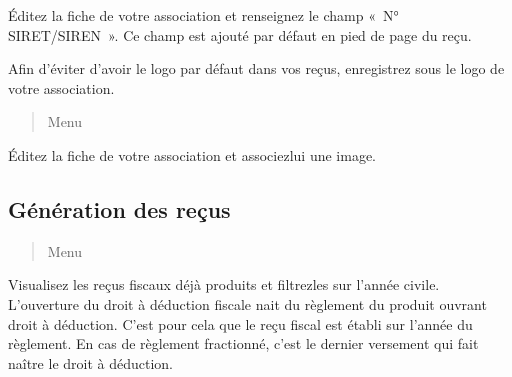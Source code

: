 \documentclass[a4paper,10pt,oneside,french]{sphinxmanual}
\begin{document}
\sphinxAtStartPar
Éditez la fiche de votre association et renseignez le champ « N° SIRET/SIREN ». Ce champ est ajouté par défaut en pied de page du reçu.

\sphinxAtStartPar
{}

\sphinxAtStartPar
Afin d’éviter d’avoir le logo par défaut dans vos reçus, enregistrez sous  le logo de votre association.
\begin{quote}

\sphinxAtStartPar
Menu 
\end{quote}

\sphinxAtStartPar
Éditez la fiche de votre association et associez\sphinxhyphen{}lui une image.


\subsection{Génération des reçus}
\label{\detokenize{member/taxreceipt:generation-des-recus}}\begin{quote}

\sphinxAtStartPar
Menu 
\end{quote}

\sphinxAtStartPar
Visualisez les reçus fiscaux déjà produits et filtrez\sphinxhyphen{}les sur l’année civile.
L’ouverture du droit à déduction fiscale nait du règlement du produit ouvrant droit à déduction. C’est pour cela que le reçu fiscal est établi sur l’année du règlement. En cas de règlement fractionné, c’est le dernier versement qui fait naître le droit à déduction.
\begin{quote}

\noindent{}
\end{quote}
\end{document}
